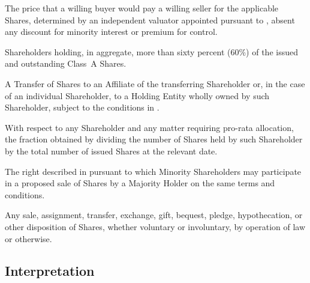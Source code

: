 \begin{description}[
  labelwidth = 3.5cm,
  leftmargin = 3.8cm,
  labelsep   = 0.3cm,
  font       = \bfseries\color{NavyDeep},
  itemsep    = 6pt
]
  \item[Fair Market Value]
    The price that a willing buyer would pay a willing seller for the applicable
    Shares, determined by an independent valuator appointed pursuant to
    , absent any discount for minority interest or premium for control.

  \item[Majority Holders]
    Shareholders holding, in aggregate, more than sixty percent (60\%) of the
    issued and outstanding Class~A Shares.

  \item[Permitted Transfer]
    A Transfer of Shares to an Affiliate of the transferring Shareholder or, in
    the case of an individual Shareholder, to a Holding Entity wholly owned by
    such Shareholder, subject to the conditions in .

  \item[Pro-Rata Share]
    With respect to any Shareholder and any matter requiring pro-rata
    allocation, the fraction obtained by dividing the number of Shares held by
    such Shareholder by the total number of issued Shares at the relevant date.

  \item[Tag-Along Right]
    The right described in  pursuant to which Minority Shareholders
    may participate in a proposed sale of Shares by a Majority Holder on the
    same terms and conditions.

  \item[Transfer]
    Any sale, assignment, transfer, exchange, gift, bequest, pledge, hypothecation,
    or other disposition of Shares, whether voluntary or involuntary, by operation
    of law or otherwise.
\end{description}

\subsection{Interpretation}


